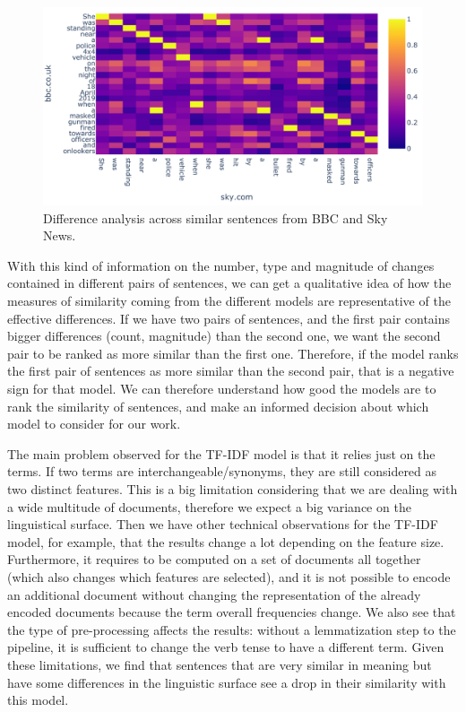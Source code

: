 \begin{figure}[!htbp]
    \centering
    \includegraphics[width=0.9\linewidth]{figures/lyra.pdf}
    \caption{Difference analysis across similar sentences from BBC and Sky News.}
    \label{fig:lyra}
\end{figure}


With this kind of information on the number, type and magnitude of changes contained in different pairs of sentences, we can get a qualitative idea of how the measures of similarity coming from the different models are representative of the effective differences.
If we have two pairs of sentences, and the first pair contains bigger differences (count, magnitude) than the second one, we want the second pair to be ranked as more similar than the first one.
Therefore, if the model ranks the first pair of sentences as more similar than the second pair, that is a negative sign for that model. %
We can therefore understand how good the models are to rank the similarity of sentences, and make an informed decision about which model to consider for our work.


The main problem observed for the TF-IDF model is that it relies just on the terms. If two terms are interchangeable/synonyms, they are still considered as two distinct features. This is a big limitation considering that we are dealing with a wide multitude of documents,  %
therefore we expect a big variance on the linguistical surface.
Then we have other technical observations for the TF-IDF model, for example, that the results change a lot depending on the feature size.
Furthermore, it requires to be computed on a set of documents all together (which also changes which features are selected), and it is not possible to encode an additional document without changing the representation of the already encoded documents because the term overall frequencies change.
We also see that the type of pre-processing affects the results: without a lemmatization step to the pipeline, it is sufficient to change the verb tense to have a different term.
Given these limitations, we find that sentences that are very similar in meaning but have some differences in the linguistic surface see a drop in their similarity with this model.

